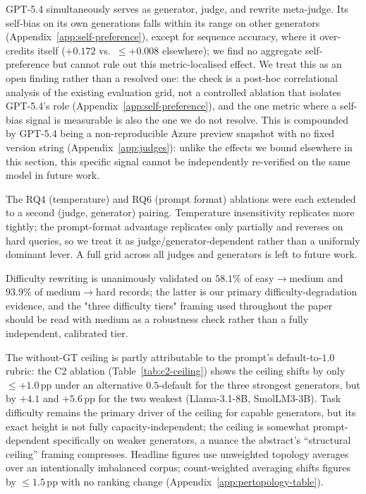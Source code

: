 GPT-5.4 simultaneously serves as generator, judge, and rewrite meta-judge. Its self-bias on its own generations falls within its range on other generators (Appendix~\ref{app:self-preference}), except for sequence accuracy, where it over-credits itself ($+0.172$ vs.\ $\leq+0.008$ elsewhere); we find no aggregate self-preference but cannot rule out this metric-localised effect. We treat this as an open finding rather than a resolved one: the check is a post-hoc correlational analysis of the existing evaluation grid, not a controlled ablation that isolates GPT-5.4's role (Appendix~\ref{app:self-preference}), and the one metric where a self-bias signal is measurable is also the one we do not resolve. This is compounded by GPT-5.4 being a non-reproducible Azure preview snapshot with no fixed version string (Appendix~\ref{app:judges}): unlike the effects we bound elsewhere in this section, this specific signal cannot be independently re-verified on the same model in future work.

The RQ4 (temperature) and RQ6 (prompt format) ablations were each extended to a second (judge, generator) pairing. Temperature insensitivity replicates more tightly; the prompt-format advantage replicates only partially and reverses on hard queries, so we treat it as judge/generator-dependent rather than a uniformly dominant lever. A full grid across all judges and generators is left to future work.

Difficulty rewriting is unanimously validated on $58.1\%$ of easy$\to$medium and $93.9\%$ of medium$\to$hard records; the latter is our primary difficulty-degradation evidence, and the "three difficulty tiers" framing used throughout the paper should be read with medium as a robustness check rather than a fully independent, calibrated tier.

The without-GT ceiling is partly attributable to the prompt's default-to-$1.0$ rubric: the C2 ablation (Table~\ref{tab:c2-ceiling}) shows the ceiling shifts by only ${\leq}{+1.0}$\,pp under an alternative $0.5$-default for the three strongest generators, but by $+4.1$ and $+5.6$\,pp for the two weakest (Llama-3.1-8B, SmolLM3-3B). Task difficulty remains the primary driver of the ceiling for capable generators, but its exact height is not fully capacity-independent; the ceiling is somewhat prompt-dependent specifically on weaker generators, a nuance the abstract's ``structural ceiling'' framing compresses. Headline figures use unweighted topology averages over an intentionally imbalanced corpus; count-weighted averaging shifts figures by $\leq1.5$\,pp with no ranking change (Appendix~\ref{app:pertopology-table}).

